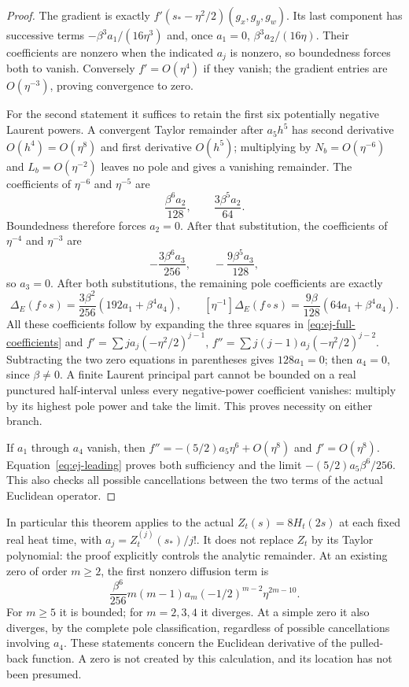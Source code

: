 \begin{proof}
The gradient is exactly $f'(s_*-\eta^2/2)(g_x,g_y,g_w)$.
Its last component has successive terms
$-\beta^3a_1/(16\eta^3)$ and, once $a_1=0$,
$\beta^3a_2/(16\eta)$. Their coefficients are nonzero when
the indicated $a_j$ is nonzero, so boundedness forces both to vanish.
Conversely $f'=O(\eta^4)$ if they vanish; the gradient entries
are $O(\eta^{-3})$, proving convergence to zero.

For the second statement it suffices to retain the first six
potentially negative Laurent powers. A convergent Taylor remainder
after $a_5h^5$ has second derivative $O(h^4)=O(\eta^8)$ and first
derivative $O(h^5)$; multiplying by $N_b=O(\eta^{-6})$ and
$L_b=O(\eta^{-2})$ leaves no pole and gives a vanishing remainder.
The coefficients of $\eta^{-6}$ and $\eta^{-5}$ are
\[
 \frac{\beta^6a_2}{128},\qquad \frac{3\beta^5a_2}{64}.
\]
Boundedness therefore forces $a_2=0$. After that substitution,
the coefficients of $\eta^{-4}$ and $\eta^{-3}$ are
\[
 -\frac{3\beta^6a_3}{256},\qquad
 -\frac{9\beta^5a_3}{128},
\]
so $a_3=0$. After both substitutions, the remaining pole coefficients
are exactly
\begin{equation}
 [\eta^{-2}]\Delta_E(f\circ s)
   =\frac{3\beta^2}{256}(192a_1+\beta^4a_4),\qquad
 [\eta^{-1}]\Delta_E(f\circ s)
   =\frac{9\beta}{128}(64a_1+\beta^4a_4).
 \label{eq:ej-final-poles}
\end{equation}
All these coefficients follow by expanding the three squares in
\eqref{eq:ej-full-coefficients} and
$f'=\sum ja_j(-\eta^2/2)^{j-1}$,
$f''=\sum j(j-1)a_j(-\eta^2/2)^{j-2}$.
Subtracting the two zero equations in parentheses gives $128a_1=0$;
then $a_4=0$, since $\beta\ne0$. A finite Laurent principal part
cannot be bounded on a real punctured half-interval unless every
negative-power coefficient vanishes: multiply by its highest pole
power and take the limit. This proves necessity on either branch.

If $a_1$ through $a_4$ vanish, then
$f''=-(5/2)a_5\eta^6+O(\eta^8)$ and $f'=O(\eta^8)$.
Equation~\eqref{eq:ej-leading} proves both sufficiency and the limit
$-(5/2)a_5\beta^6/256$. This also checks all possible cancellations
between the two terms of the actual Euclidean operator.
\end{proof}

In particular this theorem applies to the actual $Z_t(s)=8H_t(2s)$
at each fixed real heat time, with
$a_j=Z_t^{(j)}(s_*)/j!$. It does not replace $Z_t$ by its Taylor
polynomial: the proof explicitly controls the analytic remainder.
At an existing zero of order $m\ge2$, the first nonzero diffusion
term is
\[
 \frac{\beta^6}{256}m(m-1)a_m(-1/2)^{m-2}\eta^{2m-10}.
\]
For $m\ge5$ it is bounded; for $m=2,3,4$ it diverges. At a simple
zero it also diverges, by the complete pole classification, regardless
of possible cancellations involving $a_4$. These statements concern
the Euclidean derivative of the pulled-back function. A zero is not
created by this calculation, and its location has not been presumed.

